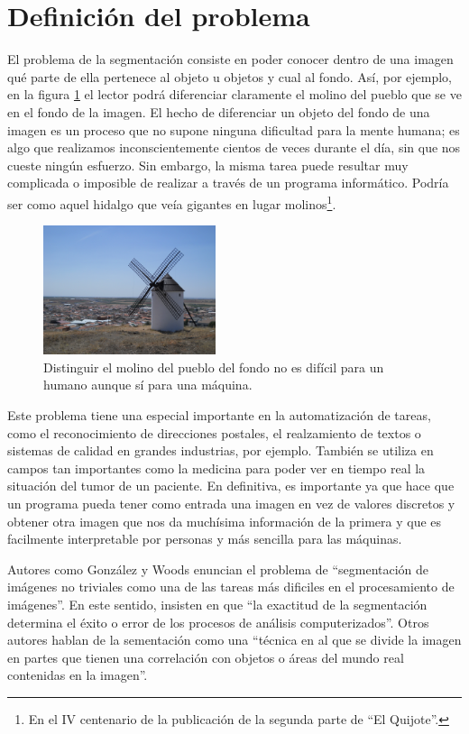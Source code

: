 \section{Definición del problema}\label{sec:definicion}
El problema de la segmentación consiste en poder conocer dentro de una imagen qué parte de ella pertenece al objeto u objetos y cual al fondo. Así, por ejemplo, en la figura \ref{img:ejemplomolino} el lector podrá diferenciar claramente el molino del pueblo que se ve en el fondo de la imagen. El hecho de diferenciar un objeto del fondo de una imagen es un proceso que no supone ninguna dificultad para la mente humana; es algo que realizamos inconscientemente cientos de veces durante el día, sin que nos cueste ningún esfuerzo. Sin embargo, la misma tarea puede resultar muy complicada o imposible de realizar a través de un programa informático. Podría ser como aquel hidalgo que veía gigantes en lugar molinos\footnote{En el IV centenario de la publicación de la segunda parte de ``El Quijote''.}.

\begin{figure}
	\centering
	\includegraphics[width=0.45\textwidth]{img/molino.jpg}
	\caption{Distinguir el molino del pueblo del fondo no es difícil para un humano aunque sí para una máquina.}
	\label{img:ejemplomolino}
\end{figure}

Este problema tiene una especial importante en la automatización de tareas, como el reconocimiento de direcciones postales, el realzamiento de textos o sistemas de calidad en grandes industrias, por ejemplo. También se utiliza en campos tan importantes como la medicina para poder ver en tiempo real la situación del tumor de un paciente. En definitiva, es importante ya que hace que un programa pueda tener como entrada una imagen en vez de valores discretos y obtener otra imagen que nos da muchísima información de la primera y que es facilmente interpretable por personas y más sencilla para las máquinas.

Autores como González y Woods \cite{lib:gonzalez} enuncian el problema de ``segmentación de imágenes no triviales como una de las tareas más dificiles en el procesamiento de imágenes''. En este sentido, insisten en que ``la exactitud de la segmentación determina el éxito o error de los procesos de análisis computerizados''. Otros autores \cite{lib:sonka} hablan de la sementación como una ``técnica en al que se divide la imagen en partes que tienen una correlación con objetos o áreas del mundo real contenidas en la imagen''.

